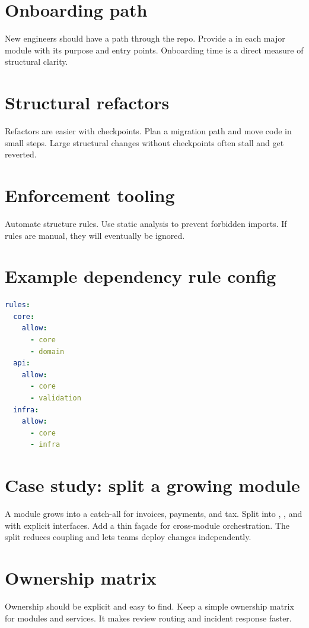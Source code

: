 \section{Onboarding path}
New engineers should have a path through the repo.
Provide a  in each major module with its purpose and entry points.
Onboarding time is a direct measure of structural clarity.

\section{Structural refactors}
Refactors are easier with checkpoints.
Plan a migration path and move code in small steps.
Large structural changes without checkpoints often stall and get reverted.

\section{Enforcement tooling}
Automate structure rules.
Use static analysis to prevent forbidden imports.
If rules are manual, they will eventually be ignored.

\section{Example dependency rule config}
\begin{lstlisting}[language=YAML]
rules:
  core:
    allow:
      - core
      - domain
  api:
    allow:
      - core
      - validation
  infra:
    allow:
      - core
      - infra
\end{lstlisting}

\section{Case study: split a growing module}
A  module grows into a catch-all for invoices, payments, and tax.
Split into , , and  with explicit interfaces.
Add a thin  façade for cross-module orchestration.
The split reduces coupling and lets teams deploy changes independently.

\section{Ownership matrix}
Ownership should be explicit and easy to find.
Keep a simple ownership matrix for modules and services.
It makes review routing and incident response faster.

